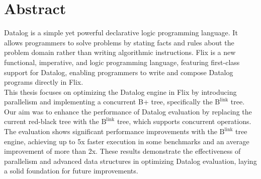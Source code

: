 \documentclass[11pt]{report}
\theoremstyle{definition}
\begin{document}

\pagestyle{empty}
\vspace*{\fill}
\clearpage


\pagestyle{plain}
\chapter*{Abstract}

Datalog is a simple yet powerful declarative logic programming language. It allows programmers to solve problems by stating facts and rules about the problem domain rather than writing algorithmic instructions. Flix is a new functional, imperative, and logic programming language, featuring first-class support for Datalog, enabling programmers to write and compose Datalog programs directly in Flix.\\
This thesis focuses on optimizing the Datalog engine in Flix by introducing parallelism and implementing a concurrent B+ tree, specifically the $\text{B}^{\text{link}}$ tree. Our aim was to enhance the performance of Datalog evaluation by replacing the current red-black tree with the $\text{B}^{\text{link}}$ tree, which supports concurrent operations.\\
The evaluation shows significant performance improvements with the $\text{B}^{\text{link}}$ tree engine, achieving up to 5x faster execution in some benchmarks and an average improvement of more than 2x. These results demonstrate the effectiveness of parallelism and advanced data structures in optimizing Datalog evaluation, laying a solid foundation for future improvements.

\end{document}
